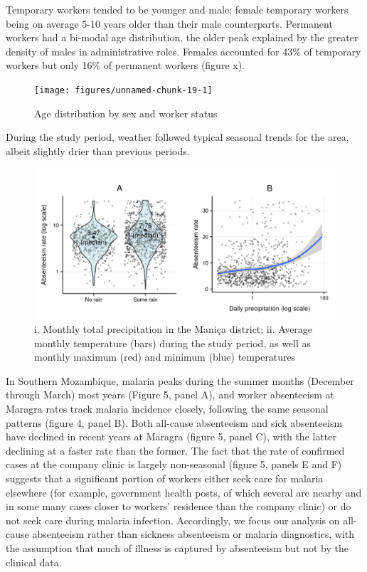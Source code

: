 \documentclass[]{article}
\begin{document}
Temporary workers tended to be younger and male; female temporary
workers being on average 5-10 years older than their male counterparts.
Permanent workers had a bi-modal age distribution, the older peak
explained by the greater density of males in administrative roles.
Females accounted for 43\% of temporary workers but only 16\% of
permanent workers (figure x).

\begin{figure}[!h]

{\centering \texttt{[image: figures/unnamed-chunk-19-1]} 

}

\caption{Age distribution by sex and worker status}\label{fig:unnamed-chunk-19}
\end{figure}

During the study period, weather followed typical seasonal trends for
the area, albeit slightly drier than previous periods.

\begin{figure}[!h]

{\centering \includegraphics{figures/unnamed-chunk-20-1} 

}

\caption{i. Monthly total precipitation in the Maniça district; ii. Average monthly temperature (bars) during the study period, as well as monthly maximum (red) and minimum (blue) temperatures}\label{fig:unnamed-chunk-20}
\end{figure}

In Southern Mozambique, malaria peaks during the summer months (December
through March) most years (Figure 5, panel A), and worker absenteeism at
Maragra rates track malaria incidence closely, following the same
seasonal patterns (figure 4, panel B). Both all-cause absenteeism and
sick absenteeism have declined in recent years at Maragra (figure 5,
panel C), with the latter declining at a faster rate than the former.
The fact that the rate of confirmed cases at the company clinic is
largely non-seasonal (figure 5, panels E and F) suggests that a
significant portion of workers either seek care for malaria elsewhere
(for example, government health posts, of which several are nearby and
in some many cases closer to workers' residence than the company clinic)
or do not seek care during malaria infection. Accordingly, we focus our
analysis on all-cause absenteeism rather than sickness absenteeism or
malaria diagnostics, with the assumption that much of illness is
captured by absenteeism but not by the clinical data.
\end{document}
